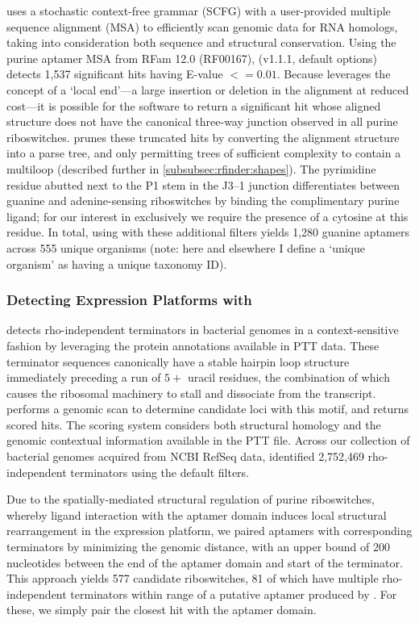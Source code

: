 \infernal \cite{infernal} uses a stochastic context-free grammar (SCFG) with a user-provided multiple sequence alignment (MSA) to efficiently scan genomic data for RNA homologs, taking into consideration both sequence and structural conservation. Using the purine aptamer MSA from RFam 12.0 (RF00167), \infernal (v1.1.1, default options) detects 1,537 significant hits having E-value $<= 0.01$. Because \infernal leverages the concept of a `local end'---a large insertion or deletion in the alignment at reduced cost---it is possible for the software to return a significant hit whose aligned structure does not have the canonical three-way junction observed in all purine riboswitches. \rfinder prunes these truncated \infernal hits by converting the alignment structure into a parse tree, and only permitting trees of sufficient complexity to contain a multiloop (described further in \ref{subsubsec:rfinder:shapes}). The pyrimidine residue abutted next to the P1 stem in the J3--1 junction differentiates between guanine and adenine-sensing riboswitches by binding the complimentary purine ligand; for our interest in \grbs exclusively we require the presence of a cytosine at this residue. In total, using \infernal with these additional filters yields 1,280 guanine aptamers across 555 unique organisms (note: here and elsewhere I define a `unique organism' as having a unique taxonomy ID).

\subsubsection{Detecting Expression Platforms with \tthp}
\label{subsubsec:rfinder:tthp}

\tthp \cite{ermolaeva:2000cl} detects rho-independent terminators in bacterial genomes in a context-sensitive fashion by leveraging the protein annotations available in PTT data. These terminator sequences canonically have a stable hairpin loop structure immediately preceding a run of $5+$ uracil residues, the combination of which causes the ribosomal machinery to stall and dissociate from the transcript. \tthp performs a genomic scan to determine candidate loci with this motif, and returns scored hits. The scoring system considers both structural homology and the genomic contextual information available in the PTT file. Across our collection of bacterial genomes acquired from NCBI RefSeq data, \tthp identified 2,752,469 rho-independent terminators using the default filters.

Due to the spatially-mediated structural regulation of purine riboswitches, whereby ligand interaction with the aptamer domain induces local structural rearrangement in the expression platform, we paired aptamers with corresponding terminators by minimizing the genomic distance, with an upper bound of 200 nucleotides between the end of the aptamer domain and start of the terminator. This approach yields 577 candidate riboswitches, 81 of which have multiple rho-independent terminators within range of a putative aptamer produced by \infernal. For these, we simply pair the closest \tthp hit with the aptamer domain.

